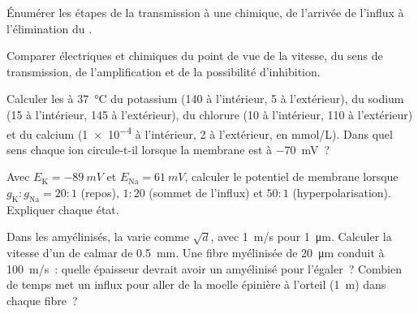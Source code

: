 \begin{exercise}[$\star$]\label{exo:b2:neurons-synapses:3}
Énumérer les étapes de la transmission à une  chimique, de
l'arrivée de l'influx à l'élimination du .
\end{exercise}

\begin{exercise}[$\star$]\label{exo:b2:neurons-synapses:4}
Comparer  électriques et chimiques du point de vue de la
vitesse, du sens de transmission, de l'amplification et de la
possibilité d'inhibition.
\end{exercise}

\begin{exercise}[$\star\star$]\label{exo:b2:neurons-synapses:5}
Calculer les  à \qty{37}{\celsius} du potassium
(140 à l'intérieur, 5 à l'extérieur), du sodium (15 à l'intérieur,
145 à l'extérieur), du chlorure (10 à l'intérieur, 110 à l'extérieur)
et du calcium (\qty{1e-4}{} à l'intérieur, 2 à l'extérieur, en
\unit{mmol/L}). Dans quel sens chaque ion circule-t-il lorsque la
membrane est à \qty{-70}{mV}~?
\end{exercise}

\begin{exercise}[$\star\star$]\label{exo:b2:neurons-synapses:6}
Avec $E_{\mathrm K} = \qty{-89}{mV}$ et $E_{\mathrm{Na}} =
\qty{+61}{mV}$, calculer le potentiel de membrane lorsque $g_{\mathrm K} :
g_{\mathrm{Na}} = 20 : 1$ (repos), $1 : 20$ (sommet de l'influx)
et $50 : 1$ (hyperpolarisation). Expliquer chaque état.
\end{exercise}

\begin{exercise}[$\star\star$]\label{exo:b2:neurons-synapses:7}
Dans les  amyélinisés, la  varie comme $\sqrt d$, avec
\qty{1}{m/s} pour \qty{1}{\micro m}. Calculer la vitesse d'un  de
calmar de \qty{0.5}{mm}. Une fibre myélinisée de \qty{20}{\micro m}
conduit à \qty{100}{m/s}~: quelle épaisseur devrait avoir un 
amyélinisé pour l'égaler~? Combien de temps met un influx pour aller de
la moelle épinière à l'orteil (\qty{1}{m}) dans chaque fibre~?
\end{exercise}

